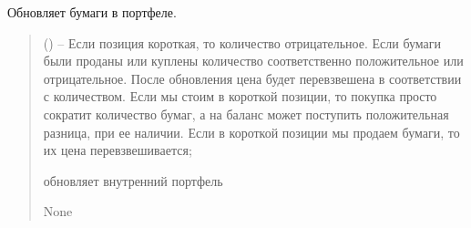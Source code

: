 \documentclass[letterpaper,10pt,english,openany,oneside]{sphinxmanual}
\begin{document}
\begin{fulllineitems}

\begin{fulllineitems}
\label{\detokenize{src.structures:src.structures.st_portfolio.Portfolio.update_securities}}
\pysigstartsignatures
{}
\pysigstopsignatures
\sphinxAtStartPar
Обновляет бумаги в портфеле.
\begin{quote}\begin{description}
\sphinxAtStartPar
{} ({\hyperref[\detokenize{src.structures:src.structures.st_strategies.StrategyResponse}]{}}) – Если позиция короткая, то количество отрицательное.
Если бумаги были проданы или куплены количество соответственно положительное или отрицательное.
После обновления цена будет перевзвешена в соответствии с количеством. Если мы стоим в короткой
позиции, то покупка просто сократит количество бумаг, а на баланс может поступить положительная
разница, при ее наличии. Если в короткой позиции мы продаем бумаги, то их цена перевзвешивается;

\sphinxAtStartPar
обновляет внутренний портфель

\sphinxAtStartPar
None

\end{description}\end{quote}

\end{fulllineitems}


\end{fulllineitems}

\end{document}
